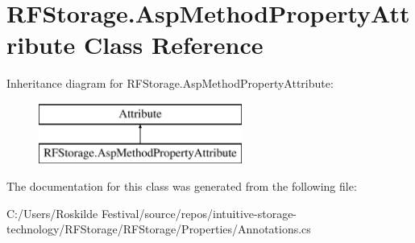 \section{R\+F\+Storage.\+Asp\+Method\+Property\+Attribute Class Reference}
\label{class_r_f_storage_1_1_asp_method_property_attribute}
Inheritance diagram for R\+F\+Storage.\+Asp\+Method\+Property\+Attribute\+:\begin{figure}[H]
\begin{center}
\leavevmode
\includegraphics[height=2.000000cm]{class_r_f_storage_1_1_asp_method_property_attribute}
\end{center}
\end{figure}


The documentation for this class was generated from the following file\+:\begin{DoxyCompactItemize}
\item 
C\+:/\+Users/\+Roskilde Festival/source/repos/intuitive-\/storage-\/technology/\+R\+F\+Storage/\+R\+F\+Storage/\+Properties/Annotations.\+cs\end{DoxyCompactItemize}

